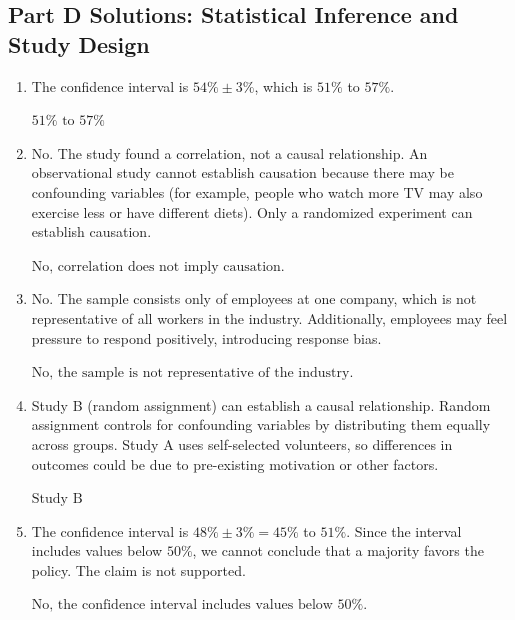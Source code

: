 \documentclass[14pt]{extarticle}
\begin{document}
\subsection*{Part D Solutions: Statistical Inference and Study Design}
\begin{enumerate}
  \item The confidence interval is \(54\% \pm 3\%\), which is \(51\%\) to \(57\%\).

  \(\boxed{51\% \text{ to } 57\%}\)

  \item No. The study found a correlation, not a causal relationship. An observational study cannot establish causation because there may be confounding variables (for example, people who watch more TV may also exercise less or have different diets). Only a randomized experiment can establish causation.

  \(\boxed{\text{No, correlation does not imply causation.}}\)

  \item No. The sample consists only of employees at one company, which is not representative of all workers in the industry. Additionally, employees may feel pressure to respond positively, introducing response bias.

  \(\boxed{\text{No, the sample is not representative of the industry.}}\)

  \item Study B (random assignment) can establish a causal relationship. Random assignment controls for confounding variables by distributing them equally across groups. Study A uses self-selected volunteers, so differences in outcomes could be due to pre-existing motivation or other factors.

  \(\boxed{\text{Study B}}\)

  \item The confidence interval is \(48\% \pm 3\% = 45\%\) to \(51\%\). Since the interval includes values below \(50\%\), we cannot conclude that a majority favors the policy. The claim is not supported.

  \(\boxed{\text{No, the confidence interval includes values below 50\%.}}\)
\end{enumerate}
\end{document}
